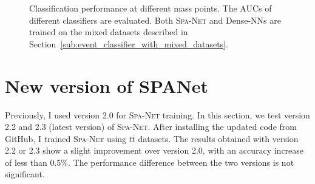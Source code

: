 \documentclass[12pt]{article}
\begin{document}
        \begin{figure}[htpb]
            \centering
            \caption{Classification performance at different mass points. The AUCs of different classifiers are evaluated. Both \textsc{Spa-Net} and Dense-NNs are trained on the mixed datasets described in Section~\ref{sub:event_classifier_with_mixed_datasets}.}  
            \label{fig:classification_performance_each_mass_point}  
        \end{figure}
\section{New version of SPANet}%
\label{sec:new_verion_of_spanet}
    Previously, I used version 2.0 for \textsc{Spa-Net} training. In this section, we test version 2.2 and 2.3 (latest version) of \textsc{Spa-Net}. After installing the updated code from GitHub, I trained \textsc{Spa-Net} using $t \overline{t}$ datasets. The results obtained with version 2.2 or 2.3 show a slight improvement over version 2.0, with an accuracy increase of less than 0.5\%. The performance difference between the two versions is not significant.


\end{document}
